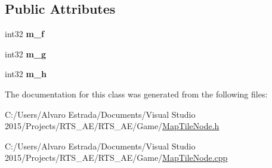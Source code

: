 \subsection*{Public Attributes}
\begin{DoxyCompactItemize}
\item 
int32 {\bfseries m\+\_\+f}\hypertarget{classae_a_star_map_tile_node_a6aa180e132d3fae48cb15114dcbda6b5}{}\label{classae_a_star_map_tile_node_a6aa180e132d3fae48cb15114dcbda6b5}

\item 
int32 {\bfseries m\+\_\+g}\hypertarget{classae_a_star_map_tile_node_ada96741068c42e62e0ab145218806eab}{}\label{classae_a_star_map_tile_node_ada96741068c42e62e0ab145218806eab}

\item 
int32 {\bfseries m\+\_\+h}\hypertarget{classae_a_star_map_tile_node_a7af7a86c9c8bea92fdc515d78bdac447}{}\label{classae_a_star_map_tile_node_a7af7a86c9c8bea92fdc515d78bdac447}

\end{DoxyCompactItemize}


The documentation for this class was generated from the following files\+:\begin{DoxyCompactItemize}
\item 
C\+:/\+Users/\+Alvaro Estrada/\+Documents/\+Visual Studio 2015/\+Projects/\+R\+T\+S\+\_\+\+A\+E/\+R\+T\+S\+\_\+\+A\+E/\+Game/\hyperlink{_map_tile_node_8h}{Map\+Tile\+Node.\+h}\item 
C\+:/\+Users/\+Alvaro Estrada/\+Documents/\+Visual Studio 2015/\+Projects/\+R\+T\+S\+\_\+\+A\+E/\+R\+T\+S\+\_\+\+A\+E/\+Game/\hyperlink{_map_tile_node_8cpp}{Map\+Tile\+Node.\+cpp}\end{DoxyCompactItemize}
